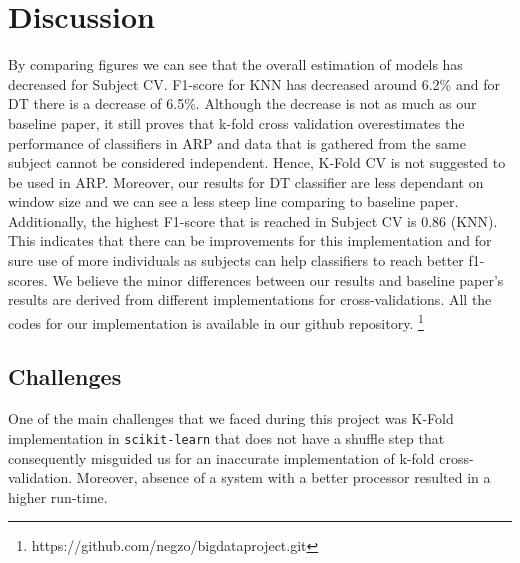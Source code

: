\documentclass[12pt, a4paper]{article}
\begin{document}
\section{Discussion}
By comparing figures we can see that the overall estimation of models has decreased for Subject CV. F1-score for KNN has decreased around 6.2\% and for DT there is a decrease of 6.5\%. Although the decrease is not as much as our baseline paper, it still proves that k-fold cross validation overestimates the performance of classifiers in ARP and data that is gathered from the same subject cannot be considered independent. Hence, K-Fold CV is not suggested to be used in ARP. Moreover, our results for DT classifier are less dependant on window size and we can see a less steep line comparing to baseline paper.
Additionally, the highest F1-score that is reached in Subject CV is 0.86 (KNN). This indicates that there can be improvements for this implementation and for sure use of more individuals as subjects can help classifiers to reach better f1-scores. We believe the minor differences between our results and baseline paper’s results are derived from different implementations for cross-validations. All the codes for our implementation is available in our github repository. \footnote{https://github.com/negzo/bigdataproject.git}

\subsection{Challenges}
One of the main challenges that we faced during this project was K-Fold implementation in \texttt{scikit-learn} that does not have a shuffle step that consequently misguided us for an inaccurate implementation of k-fold cross-validation.
Moreover, absence of a system with a better processor resulted in a higher run-time.

\printbibliography
\end{document}

